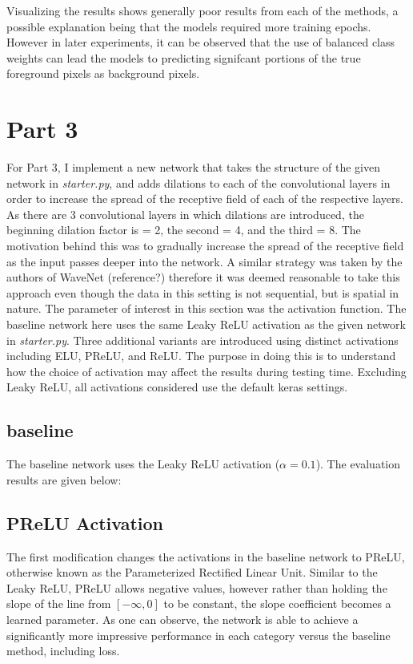 \documentclass{article}
\begin{document}
Visualizing the results shows generally poor results from each of the methods, a possible explanation being that the models required more training epochs. However in later experiments, it can be observed that the use of balanced class weights can lead the models to predicting signifcant portions of the true foreground pixels as background pixels.

\section*{Part 3}

For Part 3, I implement a new network that takes the structure of the given network in \emph{starter.py}, and adds dilations to each of the convolutional layers in order to increase the spread of the receptive field of each of the respective layers. As there are 3 convolutional layers in which dilations are introduced, the beginning dilation factor is = 2, the second = 4, and the third = 8. The motivation behind this was to gradually increase the spread of the receptive field as the input passes deeper into the network. A similar strategy was taken by the authors of WaveNet (reference?) therefore it was deemed reasonable to take this approach even though the data in this setting is not sequential, but is spatial in nature. The parameter of interest in this section was the activation function. The baseline network here uses the same Leaky ReLU activation as the given network in \emph{starter.py}. Three additional variants are introduced using distinct activations including ELU, PReLU, and ReLU. The purpose in doing this is to understand how the choice of activation may affect the results during testing time. Excluding Leaky ReLU, all activations considered use the default keras settings.

\subsection*{baseline}
The baseline network uses the Leaky ReLU activation ($\alpha = 0.1$). The evaluation results are given below:
		
		
\subsection*{PReLU Activation}
The first modification changes the activations in the baseline network to PReLU, otherwise known as the Parameterized Rectified Linear Unit. Similar to the Leaky ReLU, PReLU allows negative values, however rather than holding the slope of the line from $[-\infty,0]$ to be constant, the slope coefficient becomes a learned parameter. As one can observe, the network is able to achieve a significantly more impressive performance in each category versus the baseline method, including loss.
		
\end{document}
